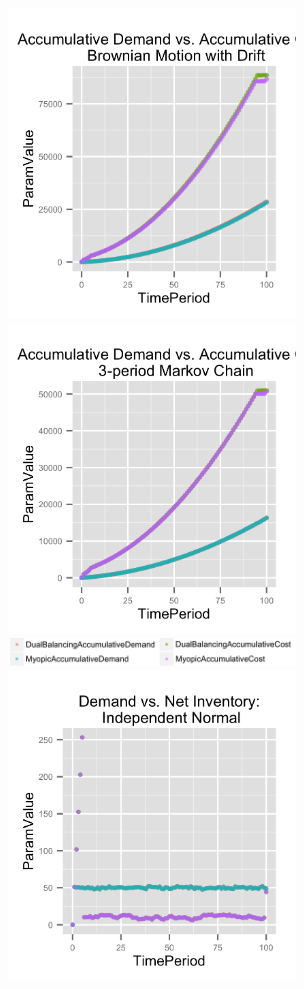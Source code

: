 \documentclass[twoside]{article}
\begin{document}
\begin{multicols}{2}
  \includegraphics[width=3.0in]{figures/AccumulativeDemandAndCost_Brownian.png}
  \includegraphics[width=3.0in]{figures/AccumulativeDemandAndCost_Markov.png}
  \includegraphics[width=3.0in]{figures/key.png}
  \includegraphics[width=3.0in]{figures/DemandAndNetInventory_Normal.png}

\end{multicols}
\end{document}
